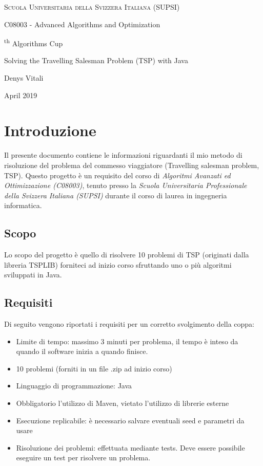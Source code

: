 \documentclass{article}
\begin{document}
\begin{titlepage}
\centering
    {\scshape Scuola Universitaria della Svizzera Italiana (SUPSI)\par}
    \vspace{0.5cm}
    {C08003 - Advanced Algorithms and Optimization\par}
    \vspace{5cm}
    {
    {\fontsize{1.5cm}{1.5cm}\textsuperscript{th} Algorithms Cup\par}
    \vspace{1cm}
    {\Large Solving the Travelling Salesman Problem (TSP) with Java \par}
    }
    \vspace{8cm}
    {\large Denys Vitali\par}
    \vspace{1cm}
    {\large April 2019}
    \vfill
\end{titlepage}

\pagebreak

\tableofcontents
\pagebreak
\section{Introduzione}
Il presente documento contiene le informazioni riguardanti il mio metodo di
risoluzione del problema del commesso viaggiatore (Travelling salesman problem, TSP).
Questo progetto è un requisito del corso di
\textit{Algoritmi Avanzati ed Ottimizzazione (C08003)}, tenuto presso la 
\textit{Scuola Universitaria Professionale della Svizzera Italiana (SUPSI)} durante il
corso di laurea in ingegneria informatica.
\subsection{Scopo}
Lo scopo del progetto è quello di risolvere 10 problemi di TSP (originati dalla
libreria TSPLIB) forniteci ad inizio corso sfruttando uno o più algoritmi
sviluppati in Java.

\subsection{Requisiti}
Di seguito vengono riportati i requisiti per un corretto svolgimento della coppa:
\begin{itemize}
\item Limite di tempo: massimo 3 minuti per problema,
il tempo è inteso da quando il software inizia a quando finisce.
\item 10 problemi (forniti in un file .zip ad inizio corso)
\item Linguaggio di programmazione: Java
\item Obbligatorio l'utilizzo di Maven, vietato l'utilizzo di librerie esterne
\item Esecuzione replicabile: è necessario salvare eventuali seed e parametri da usare
\item Risoluzione dei problemi: effettuata mediante tests. Deve essere possibile
eseguire un test per risolvere un problema.
\end{itemize}
\end{document}

